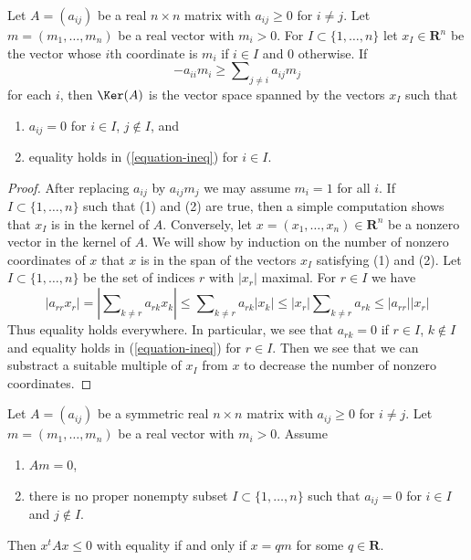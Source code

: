 \begin{lemma}
\label{lemma-recurring-real}
Let $A = (a_{ij})$ be a real $n \times n$ matrix with
$a_{ij} \geq 0$ for $i \not = j$. Let $m = (m_1, \ldots, m_n)$ be a real
vector with $m_i > 0$. For $I \subset \{1, \ldots, n\}$ let
$x_I \in \mathbf{R}^n$
be the vector whose $i$th coordinate is $m_i$ if $i \in I$
and $0$ otherwise. If
\begin{equation}
\label{equation-ineq}
-a_{ii}m_i \geq \sum\nolimits_{j \not = i} a_{ij}m_j
\end{equation}
for each $i$, then $\Ker(A)$ is the vector space
spanned by the vectors $x_I$ such that
\begin{enumerate}
\item $a_{ij} = 0$ for $i \in I$, $j \not \in I$, and
\item equality holds in (\ref{equation-ineq}) for $i \in I$.
\end{enumerate}
\end{lemma}

\begin{proof}
After replacing $a_{ij}$ by $a_{ij}m_j$ we may assume $m_i = 1$ for all $i$.
If $I \subset \{1, \ldots, n\}$ such that (1) and (2) are true,
then a simple computation shows that $x_I$ is in the kernel of $A$.
Conversely, let $x = (x_1, \ldots, x_n) \in \mathbf{R}^n$ be a
nonzero vector in the kernel of $A$. We will show by induction
on the number of nonzero coordinates of $x$ that $x$ is in the
span of the vectors $x_I$ satisfying (1) and (2). Let
$I \subset \{1, \ldots, n\}$ be the set of indices $r$ with $|x_r|$ maximal.
For $r \in I$ we have
$$
|a_{rr} x_r| = |\sum\nolimits_{k \not = r} a_{rk}x_k| \leq
\sum\nolimits_{k \not = r} a_{rk}|x_k| \leq
|x_r| \sum\nolimits_{k \not = r} a_{rk} \leq |a_{rr}||x_r|
$$
Thus equality holds everywhere. In particular, we see that
$a_{rk} = 0$ if $r \in I$, $k \not \in I$ and equality holds
in (\ref{equation-ineq}) for $r \in I$. Then we see that we
can substract a suitable multiple of $x_I$ from $x$ to decrease
the number of nonzero coordinates.
\end{proof}

\begin{lemma}
\label{lemma-recurring-symmetric-real}
Let $A = (a_{ij})$ be a symmetric real $n \times n$ matrix with
$a_{ij} \geq 0$ for $i \not = j$.
Let $m = (m_1, \ldots, m_n)$ be a real vector with $m_i > 0$.
Assume
\begin{enumerate}
\item $Am = 0$,
\item there is no proper nonempty subset $I \subset \{1, \ldots, n\}$
such that $a_{ij} = 0$ for $i \in I$ and $j \not \in I$.
\end{enumerate}
Then $x^t A x \leq 0$ with equality if and only if $x = qm$
for some $q \in \mathbf{R}$.
\end{lemma}

